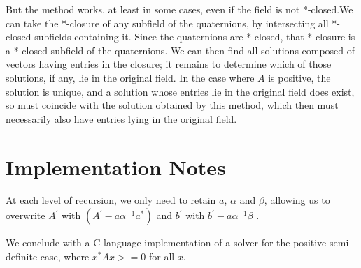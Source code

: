 \documentclass{article}
\begin{document}
But the method works, at least in some cases, even if the field is not *-closed.We can take the *-closure of any subfield of the quaternions, by intersecting all *-closed subfields containing it. Since the quaternions are *-closed, that *-closure is a *-closed subfield of the quaternions. We can then find all solutions composed of vectors having entries in the closure; it remains to determine
which of those solutions, if any, lie in the original field. In the case where
$A$ is positive, the solution is unique, and a solution whose entries lie in the original field does exist, so must coincide with the solution obtained by this method, which then must necessarily also have entries lying in the original field.

\section{Implementation Notes}
At each level of recursion, we only need to retain
$a$,
$\alpha$
and
$\beta$, allowing us to overwrite
$A^{'}$
with $(A^{'} - a\alpha^{-1}a^*)$
and
$b^{'}$ with
$b^{'}-a\alpha^{-1}\beta$
.

We conclude with a C-language implementation of a solver for the positive semi-definite case, where
$x^*Ax >=0 $ for all $x$.
\end{document}
